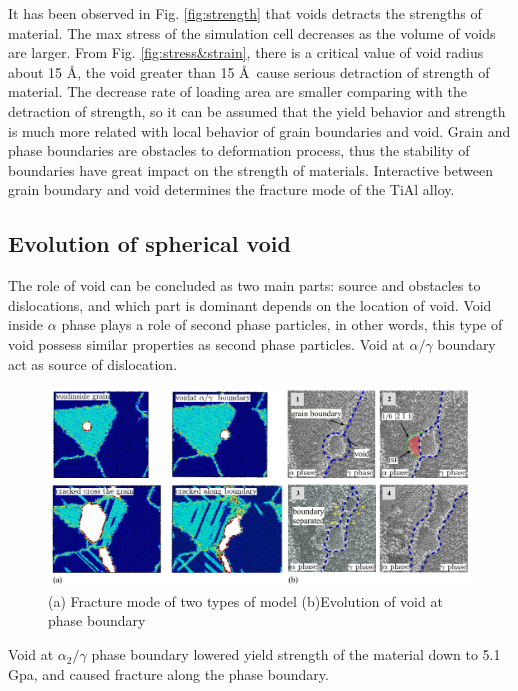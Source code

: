 \documentclass[Unknown,article,submit,moreauthors,pdftex,10pt,a4paper]{Definitions/mdpi}
\begin{document}
It has been observed in Fig. \ref{fig:strength} that voids detracts the strengths of  material. The max stress  of the simulation cell decreases as the volume of voids are larger. From Fig. \ref{fig:stress&strain}, there is a critical value of void radius about 15 \AA, the void greater than 15 \AA\ cause serious detraction of strength of material.  The decrease rate of loading area are smaller comparing with the detraction of strength, so it can be assumed that the  yield behavior and strength is much more related with local behavior of grain boundaries and void. Grain and phase boundaries are obstacles to deformation process, thus the stability of boundaries have great impact on the strength of materials. Interactive between grain boundary and void determines the fracture mode of the TiAl alloy.

\subsection{Evolution of spherical void}

The role of void can be concluded as two main parts: source and obstacles to dislocations, and which part is dominant depends on the location of void. Void inside $\alpha$ phase plays a role of second phase particles, in other words, this type of void possess similar properties as second phase particles. Void at $\alpha/\gamma$ boundary act as source of dislocation. 

\begin{figure}[ht]
	\centering
	\includegraphics[width=1\linewidth]{"img/void-gb"}
	\caption{(a) Fracture mode of two types of model  (b)Evolution of void at  phase boundary}
	\label{fig:void-gb}
\end{figure}

Void at $\alpha_2/\gamma$ phase boundary lowered yield strength of the material down to 5.1 Gpa, and caused fracture along the phase boundary. 
\end{document}
